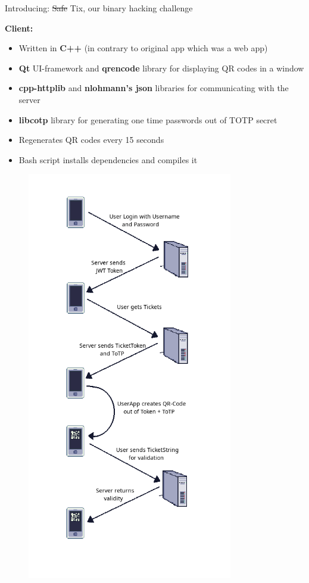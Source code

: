\documentclass[final,dvipsnames]{beamer}
\newcommand{\soutthick}[1]{%
    \renewcommand{\ULthickness}{4pt}%
       \sout{#1}%
    \renewcommand{\ULthickness}{.4pt}%
}
\newlength{\colwidth}
\begin{document}
\begin{frame}[t, fragile]
\begin{columns}[t]
\begin{column}{\colwidth}
\begin{block}{Introducing: \soutthick{Safe}Tix, our binary hacking challenge}
\begin{itemize}
            \textbf{Client:}
            \begin{itemize}
                \item Written in \textbf{C++} (in contrary to original app which was a web app)
                \item \textbf{Qt} UI-framework and \textbf{qrencode} library for displaying QR codes in a window
                \item \textbf{cpp-httplib} and \textbf{nlohmann's json} libraries for communicating with the server
                \item \textbf{libcotp} library for generating one time passwords out of TOTP secret
                \item Regenerates QR codes every 15 seconds
                \item Bash script installs dependencies and compiles it
            \end{itemize}
            \begin{figure}[h]
				\centering
				\includegraphics[width=0.8\textwidth]{figures/Workflow_v2.png}

\end{figure}
\end{itemize}
\end{block}
\end{column}
\end{columns}
\end{frame}
\end{document}
